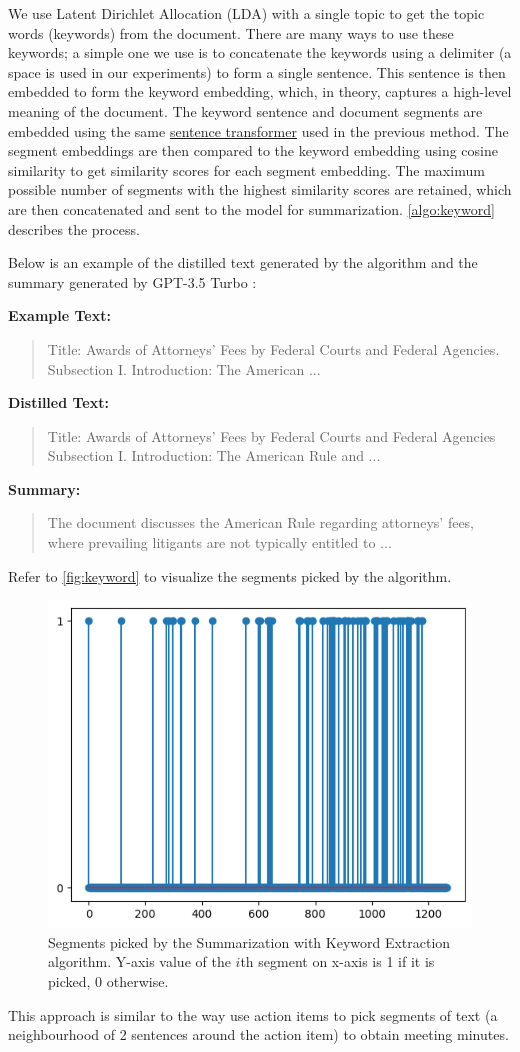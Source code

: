 We use Latent Dirichlet Allocation (LDA) \cite{blei2003latent} with a single topic to get the topic words (keywords) from the document.
There are many ways to use these keywords; a simple one we use is to concatenate the keywords using a delimiter (a space is used in our experiments) to form a single sentence.
This sentence is then embedded to form the keyword embedding, which, in theory, captures a high-level meaning of the document.
The keyword sentence and document segments are embedded using the same \href{https://huggingface.co/sentence-transformers/all-MiniLM-L6-v2}{sentence transformer} used in the previous method.
The segment embeddings are then compared to the keyword embedding using cosine similarity to get similarity scores for each segment embedding.
The maximum possible number of segments with the highest similarity scores are retained, which are then concatenated and sent to the model for summarization.
\autoref{algo:keyword} describes the process.

Below is an example of the distilled text generated by the algorithm and the summary generated by GPT-3.5 Turbo \cite{brown2020language}:

\noindent \textbf{Example Text:}
\begin{quote}
  Title: Awards of Attorneys’ Fees by Federal Courts and Federal Agencies. Subsection I. Introduction: The American ...
\end{quote}

\noindent \textbf{Distilled Text:}
\begin{quote}
  Title: Awards of Attorneys’ Fees by Federal Courts and Federal Agencies Subsection I. Introduction: The American Rule and ...
\end{quote}

\noindent \textbf{Summary:}
\begin{quote}
  The document discusses the American Rule regarding attorneys' fees, where prevailing litigants are not typically entitled to ...
\end{quote}

Refer to \autoref{fig:keyword} to visualize the segments picked by the algorithm.

\begin{figure}
  \centering
  \includegraphics*[width=.45\textwidth]{images/keyword.png}
  \caption{
    Segments picked by the Summarization with Keyword Extraction algorithm.
    Y-axis value of the $i$th segment on x-axis is 1 if it is picked, 0 otherwise.
  }
  \label{fig:keyword}
\end{figure}

This approach is similar to the way \citet{golia2024action} use action items to pick segments of text (a neighbourhood of 2 sentences around the action item) to obtain meeting minutes.
